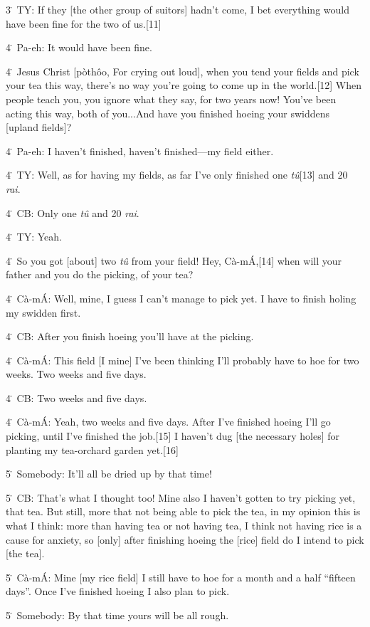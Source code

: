 3\. TY: If they [the other group of suitors] hadn't come, I bet everything would
have been fine for the two of us.[11]

4\. Pa-eh: It would have been fine.

4\. Jesus Christ [pòthôo, For crying out loud], when you tend your fields and
pick your tea this way, there's no way you're going to come up in the world.[12]
When people teach you, you ignore what they say, for two years now!  You've been
acting this way, both of you...And have you finished hoeing your swiddens [upland
fields]?

4\. Pa-eh: I haven't finished, haven't finished---my field either.

4\. TY: Well, as for having my fields, as far I've only finished one \textit{tû}[13]
and 20 \textit{rai}.

4\. CB: Only one \textit{tû} and 20 \textit{rai}.

4\. TY: Yeah.

4\. So you got [about] two \textit{tû }from your field!  Hey, Cà-mÁ,[14] when
will your father and you do the picking, of your tea?

4\. Cà-mÁ: Well, mine, I guess I can't manage to pick yet.  I have to finish
holing my swidden first.

4\. CB: After you finish hoeing you'll have at the picking.

4\. Cà-mÁ: This field [I mine] I've been thinking I'll probably have to hoe for
two weeks.  Two weeks and five days.

4\. CB: Two weeks and five days.

4\. Cà-mÁ: Yeah, two weeks and five days.  After I've finished hoeing I'll go
picking, until I've finished the job.[15]  I haven't dug [the necessary holes]
for planting my tea-orchard garden yet.[16]

5\. Somebody: It'll all be dried up by that time!

5\. CB: That's what I thought too!  Mine also I haven't gotten to try picking yet,
that tea.  But still, more that not being able to pick the tea, in my opinion this
is what I think: more than having tea or not having tea, I think not having rice
is a cause for anxiety, so [only] after finishing hoeing the [rice] field do I
intend to pick [the tea].

5\. Cà-mÁ: Mine [my rice field] I still have to hoe for a month and a half ``fifteen
days''.  Once I've finished hoeing I also plan to pick.

5\. Somebody: By that time yours will be all rough.

